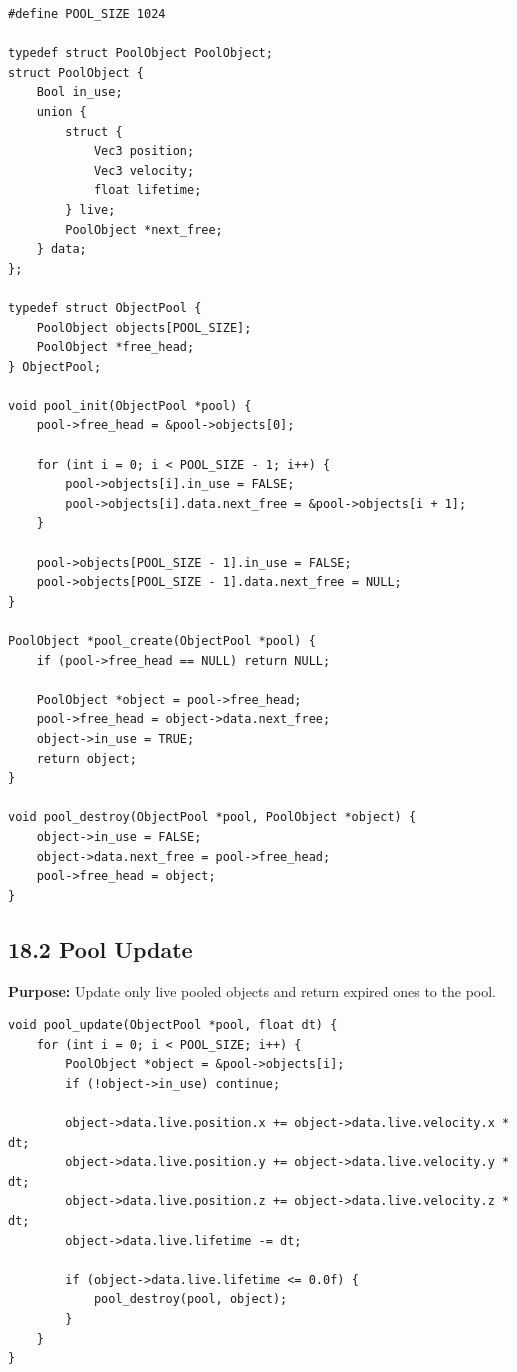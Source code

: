 \documentclass[10pt,letterpaper]{article}
\begin{document}
\begin{verbatim}
#define POOL_SIZE 1024

typedef struct PoolObject PoolObject;
struct PoolObject {
    Bool in_use;
    union {
        struct {
            Vec3 position;
            Vec3 velocity;
            float lifetime;
        } live;
        PoolObject *next_free;
    } data;
};

typedef struct ObjectPool {
    PoolObject objects[POOL_SIZE];
    PoolObject *free_head;
} ObjectPool;

void pool_init(ObjectPool *pool) {
    pool->free_head = &pool->objects[0];

    for (int i = 0; i < POOL_SIZE - 1; i++) {
        pool->objects[i].in_use = FALSE;
        pool->objects[i].data.next_free = &pool->objects[i + 1];
    }

    pool->objects[POOL_SIZE - 1].in_use = FALSE;
    pool->objects[POOL_SIZE - 1].data.next_free = NULL;
}

PoolObject *pool_create(ObjectPool *pool) {
    if (pool->free_head == NULL) return NULL;

    PoolObject *object = pool->free_head;
    pool->free_head = object->data.next_free;
    object->in_use = TRUE;
    return object;
}

void pool_destroy(ObjectPool *pool, PoolObject *object) {
    object->in_use = FALSE;
    object->data.next_free = pool->free_head;
    pool->free_head = object;
}
\end{verbatim}

\subsection{18.2 Pool Update}

\textbf{Purpose:} Update only live pooled objects and return expired ones to the pool.

\begin{verbatim}
void pool_update(ObjectPool *pool, float dt) {
    for (int i = 0; i < POOL_SIZE; i++) {
        PoolObject *object = &pool->objects[i];
        if (!object->in_use) continue;

        object->data.live.position.x += object->data.live.velocity.x * dt;
        object->data.live.position.y += object->data.live.velocity.y * dt;
        object->data.live.position.z += object->data.live.velocity.z * dt;
        object->data.live.lifetime -= dt;

        if (object->data.live.lifetime <= 0.0f) {
            pool_destroy(pool, object);
        }
    }
}
\end{verbatim}
\end{document}
